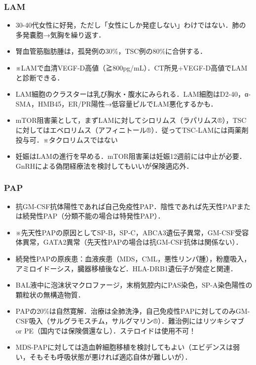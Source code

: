 \subsubsection{LAM}

\begin{itemize}
\item 30-40代女性に好発，ただし「女性にしか発症しない」わけではない．肺の多発嚢胞→気胸を繰り返す．
\item 腎血管筋脂肪腫は，孤発例の30\%，TSC例の80\%に合併する．
\item ※LAMで血清VEGF-D高値（≧800pg/mL）．CT所見+VEGF-D高値でLAMと診断できる．
\item LAM細胞のクラスターは乳び胸水・腹水にみられる．LAM細胞はD2-40，α-SMA，HMB45，ER/PR陽性→低容量ピルでLAM悪化するかも．
\item mTOR阻害薬として，まずLAMに対してシロリムス（ラパリムス®），TSCに対してはエベロリムス（アフィニトール®）．従ってTSC-LAMには両薬剤投与可．※タクロリムスではない
\item 妊娠はLAMの進行を早める．mTOR阻害薬は妊娠12週前には中止が必要．GnRHによる偽閉経療法を検討してもいいが保険適応外．
\end{itemize}


\subsubsection{PAP}

\begin{itemize}
\item 抗GM-CSF抗体陽性であれば自己免疫性PAP．陰性であれば先天性PAPまたは続発性PAP（分類不能の場合は特発性PAP）．
\item ※先天性PAPの原因としてSP-B，SP-C，ABCA3遺伝子異常，GM-CSF受容体異常，GATA2異常（先天性PAPの場合は抗GM-CSF抗体は関係ない）．
\item 続発性PAPの原疾患：血液疾患（MDS，CML，悪性リンパ腫），粉塵吸入，アミロイドーシス，臓器移植後など．HLA-DRB1遺伝子が発症と関連．
\item BAL液中に泡沫状マクロファージ，末梢気腔内にPAS染色，SP-A染色陽性の顆粒状の無構造物質．
\item PAPの20\%は自然寛解．治療は全肺洗浄，自己免疫性PAPに対してのみGM-CSF吸入（サルグラモスチム，サルグマリン®）．難治例にはリツキシマブ or PE（国内では保険償還なし）．ステロイドは使用不可！
\item MDS-PAPに対しては造血幹細胞移植を検討してもよい（エビデンスは弱い，そもそも呼吸状態が悪ければ適応自体が難しいが）．
\end{itemize}


